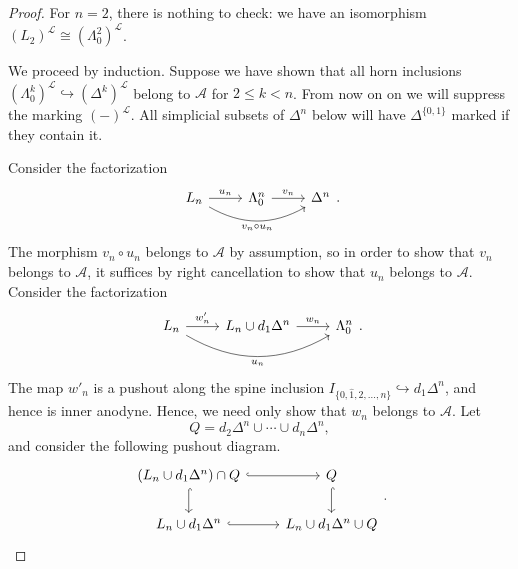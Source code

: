 \documentclass[main.tex]{subfiles}
\begin{document}
\begin{proof}
  For $n = 2$, there is nothing to check: we have an isomorphism $(L_{2})^{\mathcal{L}} \cong (\Lambda^{2}_{0})^{\mathcal{L}}$.

  We proceed by induction. Suppose we have shown that all horn inclusions $(\Lambda^{k}_{0})^{\mathcal{L}} \hookrightarrow (\Delta^{k})^{\mathcal{L}}$ belong to $\mathcal{A}$ for $2 \leq k < n$. From now on on we will suppress the marking $(-)^{\mathcal{L}}$. All simplicial subsets of $\Delta^{n}$ below will have $\Delta^{\{0, 1\}}$ marked if they contain it.

  Consider the factorization
  \begin{equation*}
    \begin{tikzcd}
      L_{n}
      \arrow[r, "u_{n}"]
      \arrow[rr, bend right, swap, "v_{n} \circ u_{n}"]
      & \Lambda^{n}_{0}
      \arrow[r, "v_{n}"]
      & \Delta^{n}
    \end{tikzcd}.
  \end{equation*}
  The morphism $v_{n} \circ u_{n}$ belongs to $\mathcal{A}$ by assumption, so in order to show that $v_{n}$ belongs to $\mathcal{A}$, it suffices by right cancellation to show that $u_{n}$ belongs to $\mathcal{A}$. Consider the factorization
  \begin{equation*}
    \begin{tikzcd}
      L_{n}
      \arrow[r, "w'_{n}"]
      \arrow[rr, bend right, swap, "u_{n}"]
      & L_{n} \cup d_{1} \Delta^{n}
      \arrow[r, "w_{n}"]
      & \Lambda^{n}_{0}
    \end{tikzcd}.
  \end{equation*}
  The map $w'_{n}$ is a pushout along the spine inclusion $I_{\{0, \hat{1}, 2, \ldots, n\}} \hookrightarrow d_{1}\Delta^{n}$, and hence is inner anodyne. Hence, we need only show that $w_{n}$ belongs to $\mathcal{A}$. Let
  \begin{equation*}
    Q = d_{2} \Delta^{n} \cup \cdots \cup d_{n} \Delta^{n},
  \end{equation*}
  and consider the following pushout diagram.
  \begin{equation*}
    \begin{tikzcd}
      (L_{n} \cup d_{1}\Delta^{n}) \cap Q
      \arrow[r, hook]
      \arrow[d, hook]
      & Q
      \arrow[d, hook]
      \\
      L_{n} \cup d_{1} \Delta^{n}
      \arrow[r, hook]
      & L_{n} \cup d_{1}\Delta^{n} \cup Q
    \end{tikzcd}.
  \end{equation*}

\end{proof}
\end{document}
